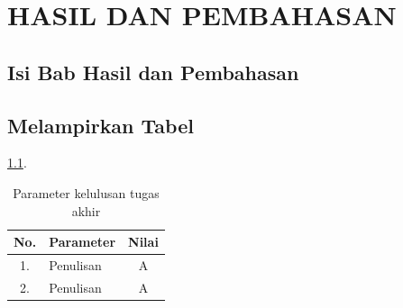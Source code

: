 \chapter{HASIL DAN PEMBAHASAN}

\section{Isi Bab Hasil dan Pembahasan}
\blindtext

\section{Melampirkan Tabel}
\blindtext \ref{table:nilai}.

\begin{table}[H]
\centering
\caption{Parameter kelulusan tugas akhir}
\begin{tabular}{ clc }
\hline
\textbf{No.} & \textbf{Parameter } & \textbf{Nilai} \\
\hline
1. & Penulisan & A \\
2. & Penulisan & A \\
\hline
\end{tabular}
\label{table:nilai}
\end{table}


